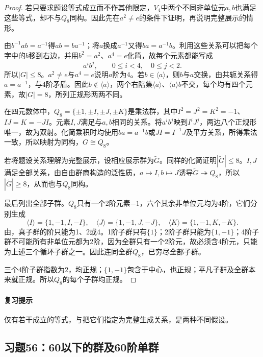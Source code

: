 
\begin{proof}
若只要求题设等式成立而不作其他限定，$V_4$中两个不同非单位元$a,b$也满足这些等式，却不与$Q_8$同构。因此先在$a^2\ne e$的条件下证明，再说明完整展示的情形。

由$b^{-1}ab=a^{-1}$得$ab=ba^{-1}$；将$a$换成$a^{-1}$又得$ba=a^{-1}b$。利用这些关系可以把每个字中的$b$移到右边，并用$b^2=a^2$、$a^4=e$化简，故每个元素都能写成
\[
a^ib^j,\qquad0\leq i<4,\quad0\leq j<2.
\]
所以$|G|\leq8$。$a^2\ne e$与$a^4=e$说明$a$阶为4。若$b\in\langle a\rangle$，则$b$与$a$交换，由共轭关系得$a=a^{-1}$，与4阶矛盾。因此$b\notin\langle a\rangle$，两个右陪集$\langle a\rangle$、$\langle a\rangle b$不交，每个均有四个元素，故$|G|=8$，所列正规形两两不同。

在四元数体中，$Q_8=\{\pm1,\pm I,\pm J,\pm K\}$是乘法群，其中$I^2=J^2=K^2=-1$、$IJ=K=-JI$。元素$I,J$满足与$a,b$相同的关系。将$a^ib^j$映到$I^iJ^j$，两边八个正规形唯一，故为双射。化简乘积时均使用$ba=a^{-1}b$或$JI=I^{-1}J$及平方关系，所得乘法一致，所以映射为同构，$G\cong Q_8$。

若将题设关系理解为完整展示，设相应展示群为$\widetilde G$。同样的化简证明$|\widetilde G|\leq8$。$I,J$满足全部关系，由自由群商构造的泛性质，$a\mapsto I,b\mapsto J$诱导$\widetilde G\twoheadrightarrow Q_8$，所以$|\widetilde G|\geq8$，从而也与$Q_8$同构。

最后列出全部子群。$Q_8$只有一个2阶元素$-1$，六个其余非单位元均为4阶，它们分别生成
\[
\langle I\rangle=\{1,-1,I,-I\},\quad
\langle J\rangle=\{1,-1,J,-J\},\quad
\langle K\rangle=\{1,-1,K,-K\}.
\]
由，真子群的阶只能为1、2或4。1阶子群只有$\{1\}$；2阶子群只能为$\{1,-1\}$；4阶子群不可能所有非单位元都为2阶，因为全群只有一个2阶元，故必须含4阶元，只能为上述三个循环子群之一。因此连同全群$Q_8$，已穷尽全部子群。

三个4阶子群指数为2，均正规；$\{1,-1\}$包含于中心，也正规；平凡子群及全群本来就正规。所以$Q_8$的每个子群均正规。
\end{proof}

\paragraph{复习提示}
仅有若干成立的等式，与把它们指定为完整生成关系，是两种不同假设。


\subsection{习题56：\texorpdfstring{60以下的群及60阶单群}{60以下的群及60阶单群}}
\label{ex:2:56}

